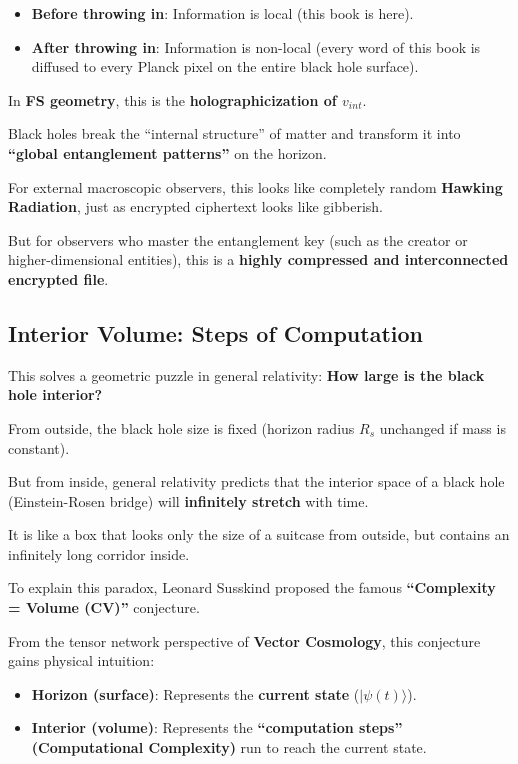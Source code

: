 \begin{itemize}
\item \textbf{Before throwing in}: Information is local (this book is here).

\item \textbf{After throwing in}: Information is non-local (every word of this book is diffused to every Planck pixel on the entire black hole surface).
\end{itemize}

In \textbf{FS geometry}, this is the \textbf{holographicization of $v_{int}$}.

Black holes break the ``internal structure'' of matter and transform it into \textbf{``global entanglement patterns''} on the horizon.

For external macroscopic observers, this looks like completely random \textbf{Hawking Radiation}, just as encrypted ciphertext looks like gibberish.

But for observers who master the entanglement key (such as the creator or higher-dimensional entities), this is a \textbf{highly compressed and interconnected encrypted file}.

\subsection{Interior Volume: Steps of Computation}

This solves a geometric puzzle in general relativity: \textbf{How large is the black hole interior?}

From outside, the black hole size is fixed (horizon radius $R_s$ unchanged if mass is constant).

But from inside, general relativity predicts that the interior space of a black hole (Einstein-Rosen bridge) will \textbf{infinitely stretch} with time.

It is like a box that looks only the size of a suitcase from outside, but contains an infinitely long corridor inside.

To explain this paradox, Leonard Susskind proposed the famous \textbf{``Complexity = Volume (CV)''} conjecture.

From the tensor network perspective of \textbf{Vector Cosmology}, this conjecture gains physical intuition:

\begin{itemize}
\item \textbf{Horizon (surface)}: Represents the \textbf{current state} ($|\psi(t)\rangle$).

\item \textbf{Interior (volume)}: Represents the \textbf{``computation steps'' (Computational Complexity)} run to reach the current state.
\end{itemize}

